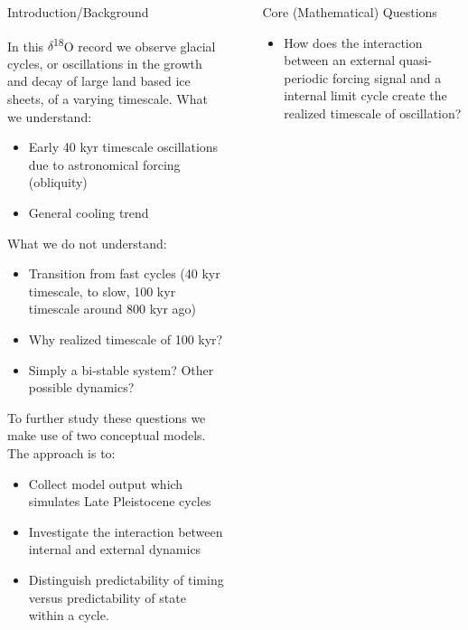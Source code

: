 \documentclass[final]{beamer}
\newlength{\sepwid}
\newlength{\onecolwid}
\newlength{\twocolwid}
\begin{document}
\begin{frame}[t]
\begin{columns}[t]
\begin{column}{\twocolwid}
\begin{columns}[t,totalwidth=\twocolwid]
\begin{column}{\onecolwid}
\begin{block}{Introduction/Background}
\begin{center}
\begin{figure}
		\end{figure}
		\end{center}
		In this $\delta$\textsuperscript{18}O record we observe glacial cycles, or oscillations in the growth and decay of large land based ice sheets, of a varying timescale.
		What we understand: 
			\begin{itemize}
			\small \item Early 40 kyr timescale oscillations due to astronomical forcing (obliquity)
			\small \item General cooling trend	
			\end{itemize}
		What we do not understand: 
			\begin{itemize}
    	  		\small \item Transition from fast cycles (40 kyr timescale, to slow, 100 kyr timescale around 800 kyr ago)
    	  		\small \item Why realized timescale of 100 kyr?
    	  		\small \item Simply a bi-stable system? Other possible dynamics?
    	  	\end{itemize}
		To further study these questions we make use of two conceptual models. The approach is to:
		\begin{itemize}
		\small \item Collect model output which simulates Late Pleistocene cycles
		\small \item Investigate the interaction between internal and external dynamics
		\small \item Distinguish predictability of timing versus predictability of state within a cycle.
		\end{itemize}
      \end{block}
     \end{column}
    \begin{column}{\sepwid}\end{column}       
    \begin{column}{\onecolwid}
    	  \begin{alertblock}{Core (Mathematical) Questions}
    	   \begin{itemize}
    	   	\item How does the interaction between an external quasi-periodic forcing signal and a internal limit cycle create the realized timescale of oscillation?

\end{itemize}
\end{alertblock}
\end{column}
\end{columns}
\end{column}
\end{columns}
\end{frame}
\end{document}
